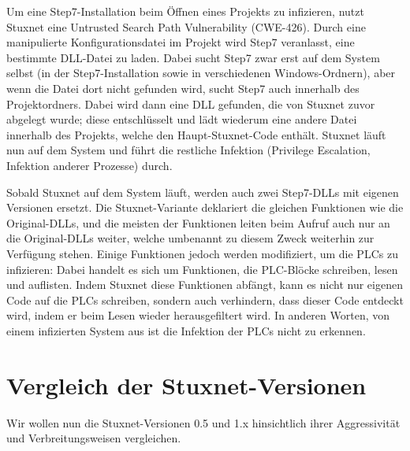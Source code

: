 \documentclass[a4paper]{article}
\begin{document}
Um eine Step7-Installation beim Öffnen eines Projekts zu infizieren, nutzt Stuxnet eine Untrusted Search Path Vulnerability (CWE-426\cite{cwe_searchpath}).
Durch eine manipulierte Konfigurationsdatei im Projekt wird Step7 veranlasst, eine bestimmte DLL-Datei zu laden.
Dabei sucht Step7 zwar erst auf dem System selbst (in der Step7-Installation sowie in verschiedenen Windows-Ordnern), %
aber wenn die Datei dort nicht gefunden wird, sucht Step7 auch innerhalb des Projektordners.
Dabei wird dann eine DLL gefunden, die von Stuxnet zuvor abgelegt wurde;
diese entschlüsselt und lädt wiederum eine andere Datei innerhalb des Projekts, welche den Haupt-Stuxnet-Code enthält.
Stuxnet läuft nun auf dem System und führt die restliche Infektion (Privilege Escalation, Infektion anderer Prozesse) durch.

Sobald Stuxnet auf dem System läuft, werden auch zwei Step7-DLLs mit eigenen Versionen ersetzt.
Die Stuxnet-Variante deklariert die gleichen Funktionen wie die Original-DLLs,
und die meisten der Funktionen leiten beim Aufruf auch nur an die Original-DLLs weiter,
welche umbenannt zu diesem Zweck weiterhin zur Verfügung stehen.
Einige Funktionen jedoch werden modifiziert, um die PLCs zu infizieren:
Dabei handelt es sich um Funktionen, die PLC-Blöcke schreiben, lesen und auflisten.
Indem Stuxnet diese Funktionen abfängt, kann es nicht nur eigenen Code auf die PLCs schreiben,
sondern auch verhindern, dass dieser Code entdeckt wird, indem er beim Lesen wieder herausgefiltert wird.
In anderen Worten, von einem infizierten System aus ist die Infektion der PLCs nicht zu erkennen.


\section{Vergleich der Stuxnet-Versionen}

Wir wollen nun die Stuxnet-Versionen 0.5 und 1.x hinsichtlich ihrer Aggressivität und Verbreitungsweisen vergleichen.
\end{document}

